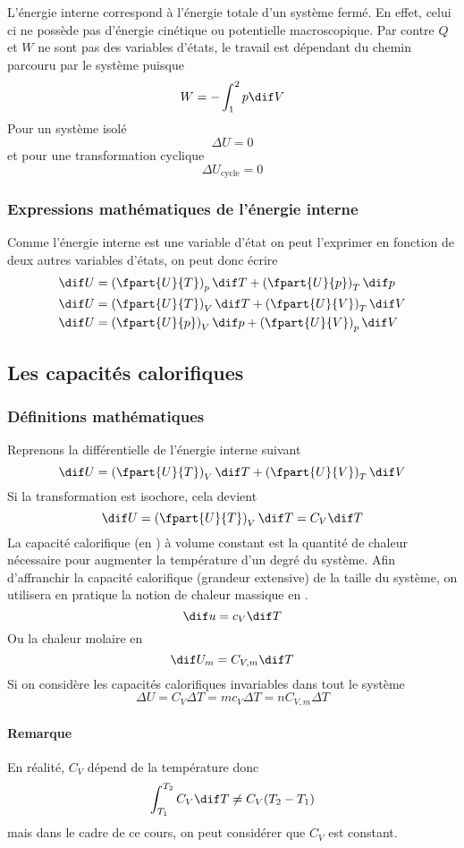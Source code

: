 L'énergie interne correspond à l'énergie totale d'un système fermé.
En effet, celui ci ne possède pas d'énergie cinétique ou
potentielle macroscopique.
Par contre $Q$ et $W$ ne sont pas des variables d'états,
le travail est dépendant du chemin parcouru par le système puisque
\[W = - \int_1^2p\dif V \]
Pour un système isolé
\[ \Delta U = 0 \]
et pour une transformation cyclique
\[ \Delta U_\mathrm{cycle} = 0 \]

\subsubsection{Expressions mathématiques de l'énergie interne}
Comme l'énergie interne est une variable d'état on peut l'exprimer en
fonction de deux autres variables d'états, on peut donc écrire
\begin{align*}
  \dif U & =
  \left(\fpart{U}{T}\right)_p \dif T +
  \left(\fpart{U}{p}\right)_T \dif p\\
  \dif U & =
  \left(\fpart{U}{T}\right)_V \dif T +
  \left(\fpart{U}{V}\right)_T \dif V\\
  \dif U & =
  \left(\fpart{U}{p}\right)_V \dif p +
  \left(\fpart{U}{V}\right)_p \dif V
\end{align*}

\subsection{Les capacités calorifiques}
\subsubsection{Définitions mathématiques}
Reprenons la différentielle de l'énergie interne suivant
\[ \dif U = \left(\fpart{U}{T}\right)_V \dif T +
\left(\fpart{U}{V}\right)_T \dif V \]
Si la transformation est isochore, cela devient
\[ \dif U = \left(\fpart{U}{T}\right)_V \dif T = C_V \dif T \]
La capacité calorifique (en \joule\per\kelvin) à volume constant est
la quantité de chaleur nécessaire pour
augmenter la température d'un degré du système.
Afin d'affranchir la capacité calorifique (grandeur extensive)
de la taille du système, on utilisera en pratique
la notion de chaleur massique en \joule\per\kilogram\cdot\kelvin.
\[ \dif u = c_V\dif T \]
Ou la chaleur molaire en \joule\per\mole\cdot\kelvin
\[ \dif U_m = C_{V,m}\dif T \]
Si on considère les capacités calorifiques invariables dans tout le système
\[ \Delta U = C_V \Delta T = mc_V\Delta T = nC_{V,m}\Delta T \]

\paragraph{Remarque}
En réalité, $C_V$ dépend de la température donc
\[ \int_{T_1}^{T_2} C_V \dif T \neq C_V(T_2 - T_1) \]
mais dans le cadre de ce cours, on peut considérer que $C_V$ est constant.

